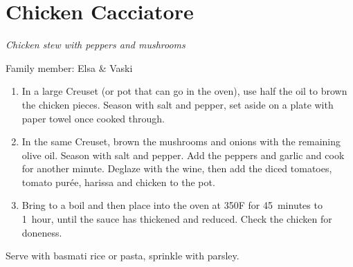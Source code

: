 \chapter{Chicken Cacciatore}
\label{ch:chickencacciatore}


\textit{Chicken stew with peppers and mushrooms}

Family member: Elsa \& Vaski

\begin{enumerate}
    \item In a large Creuset (or pot that can go in the oven), use half the oil to brown the chicken pieces. Season with salt and pepper, set aside on a plate with paper towel once cooked through.
    \item In the same Creuset, brown the mushrooms and onions with the remaining olive oil. Season with salt and pepper. Add the peppers and garlic and cook for another minute. Deglaze with the wine, then add the diced tomatoes, tomato purée, harissa and chicken to the pot.
    \item Bring to a boil and then place into the oven at 350\degree F for 45~minutes to 1~hour, until the sauce has thickened and reduced. Check the chicken for doneness.

\end{enumerate}

Serve with basmati rice or pasta, sprinkle with parsley.
